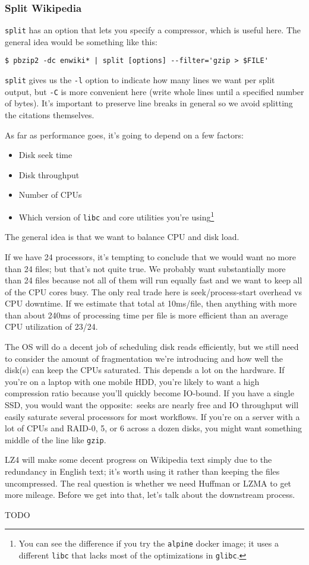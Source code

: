 \subsubsection{Split Wikipedia}
{\tt split} has an option that lets you specify a compressor, which is useful
here. The general idea would be something like this:

\begin{verbatim}
$ pbzip2 -dc enwiki* | split [options] --filter='gzip > $FILE'\end{verbatim}

{\tt split} gives us the {\tt -l} option to indicate how many lines we want per
split output, but {\tt -C} is more convenient here (write whole lines until a
specified number of bytes). It's important to preserve line breaks in general so
we avoid splitting the citations themselves.

As far as performance goes, it's going to depend on a few factors:

\begin{itemize}
  \item Disk seek time
  \item Disk throughput
  \item Number of CPUs
  \item Which version of {\tt libc} and core utilities you're using\footnote{You
    can see the difference if you try the {\tt alpine} docker image; it uses a
    different {\tt libc} that lacks most of the optimizations in {\tt glibc}.}
\end{itemize}

The general idea is that we want to balance CPU and disk load.

If we have 24 processors, it's tempting to conclude that we would want no more
than 24 files; but that's not quite true. We probably want substantially more
than 24 files because not all of them will run equally fast and we want to keep
all of the CPU cores busy. The only real trade here is seek/process-start
overhead vs CPU downtime. If we estimate that total at 10ms/file, then anything
with more than about 240ms of processing time per file is more efficient than an
average CPU utilization of 23/24.

The OS will do a decent job of scheduling disk reads efficiently, but we still
need to consider the amount of fragmentation we're introducing and how well the
disk(s) can keep the CPUs saturated. This depends a lot on the hardware. If
you're on a laptop with one mobile HDD, you're likely to want a high compression
ratio because you'll quickly become IO-bound. If you have a single SSD, you
would want the opposite:~seeks are nearly free and IO throughput will easily
saturate several processors for most workflows. If you're on a server with a lot
of CPUs and RAID-0, 5, or 6 across a dozen disks, you might want something
middle of the line like {\tt gzip}.

LZ4 will make some decent progress on Wikipedia text simply due to the
redundancy in English text; it's worth using it rather than keeping the files
uncompressed. The real question is whether we need Huffman or LZMA to get more
mileage. Before we get into that, let's talk about the downstream process.

TODO
